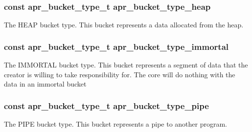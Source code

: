 \subsubsection[{\texorpdfstring{apr\+\_\+bucket\+\_\+type\+\_\+heap}{apr_bucket_type_heap}}]{ const {\bf apr\+\_\+bucket\+\_\+type\+\_\+t} apr\+\_\+bucket\+\_\+type\+\_\+heap}\hypertarget{group__APR__Util__Bucket__Brigades_gae48a3b98a024d04fd3d11d7b05a3014b}{}\label{group__APR__Util__Bucket__Brigades_gae48a3b98a024d04fd3d11d7b05a3014b}
The H\+E\+AP bucket type. This bucket represents a data allocated from the heap. 
\subsubsection[{\texorpdfstring{apr\+\_\+bucket\+\_\+type\+\_\+immortal}{apr_bucket_type_immortal}}]{ const {\bf apr\+\_\+bucket\+\_\+type\+\_\+t} apr\+\_\+bucket\+\_\+type\+\_\+immortal}\hypertarget{group__APR__Util__Bucket__Brigades_gac254c94d966f069f8942a04ec89f54ae}{}\label{group__APR__Util__Bucket__Brigades_gac254c94d966f069f8942a04ec89f54ae}
The I\+M\+M\+O\+R\+T\+AL bucket type. This bucket represents a segment of data that the creator is willing to take responsibility for. The core will do nothing with the data in an immortal bucket 
\subsubsection[{\texorpdfstring{apr\+\_\+bucket\+\_\+type\+\_\+pipe}{apr_bucket_type_pipe}}]{ const {\bf apr\+\_\+bucket\+\_\+type\+\_\+t} apr\+\_\+bucket\+\_\+type\+\_\+pipe}\hypertarget{group__APR__Util__Bucket__Brigades_ga010d5dcb116755a68090d573584cd256}{}\label{group__APR__Util__Bucket__Brigades_ga010d5dcb116755a68090d573584cd256}
The P\+I\+PE bucket type. This bucket represents a pipe to another program. 
